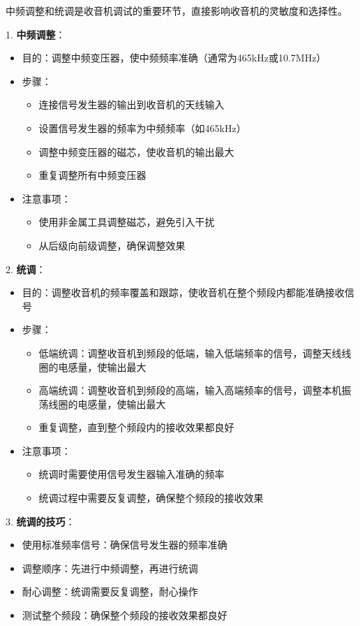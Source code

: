 \documentclass[12pt,UTF8]{ctexbook}
\begin{document}
中频调整和统调是收音机调试的重要环节，直接影响收音机的灵敏度和选择性。

1. \textbf{中频调整}：
   \begin{itemize}[leftmargin=3.5em]
   \item 目的：调整中频变压器，使中频频率准确（通常为465kHz或10.7MHz）
   \item 步骤：
     \begin{itemize}
     \item 连接信号发生器的输出到收音机的天线输入
     \item 设置信号发生器的频率为中频频率（如465kHz）
     \item 调整中频变压器的磁芯，使收音机的输出最大
     \item 重复调整所有中频变压器
     \end{itemize}
   \item 注意事项：
     \begin{itemize}
     \item 使用非金属工具调整磁芯，避免引入干扰
     \item 从后级向前级调整，确保调整效果
     \end{itemize}
   \end{itemize}

2. \textbf{统调}：
   \begin{itemize}[leftmargin=3.5em]
   \item 目的：调整收音机的频率覆盖和跟踪，使收音机在整个频段内都能准确接收信号
   \item 步骤：
     \begin{itemize}
     \item 低端统调：调整收音机到频段的低端，输入低端频率的信号，调整天线线圈的电感量，使输出最大
     \item 高端统调：调整收音机到频段的高端，输入高端频率的信号，调整本机振荡线圈的电感量，使输出最大
     \item 重复调整，直到整个频段内的接收效果都良好
     \end{itemize}
   \item 注意事项：
     \begin{itemize}
     \item 统调时需要使用信号发生器输入准确的频率
     \item 统调过程中需要反复调整，确保整个频段的接收效果
     \end{itemize}
   \end{itemize}

3. \textbf{统调的技巧}：
   \begin{itemize}[leftmargin=3.5em]
   \item 使用标准频率信号：确保信号发生器的频率准确
   \item 调整顺序：先进行中频调整，再进行统调
   \item 耐心调整：统调需要反复调整，耐心操作
   \item 测试整个频段：确保整个频段的接收效果都良好
   \end{itemize}
\end{document}
